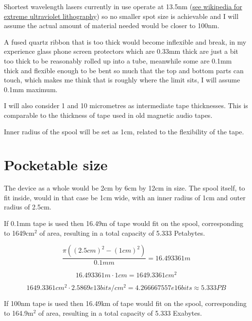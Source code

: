 \documentclass[a4paper]{article}
\begin{document}
	\medskip
	
	Shortest wavelength lasers currently in use operate at 13.5nm (\href{https://en.wikipedia.org/wiki/Extreme_ultraviolet_lithography}{see wikipedia for extreme ultraviolet lithography}) so no smaller spot size is achievable and I will assume the actual amount of material needed would be closer to 100nm.
	
	\medskip
	
	A fused quartz ribbon that is too thick would become inflexible and break, in my experience glass phone screen protectors which are 0.33mm thick are just a bit too thick to be reasonably rolled up into a tube, meanwhile some are 0.1mm thick and flexible enough to be bent so much that the top and bottom parts can touch, which makes me think that is roughly where the limit sits, I will assume 0.1mm maximum.
	
	\medskip
	
	I will also consider 1 and 10 micrometres as intermediate tape thicknesses. This is comparable to the thickness of tape used in old magnetic audio tapes.
	
	\bigskip
	
	Inner radius of the spool will be set as 1cm, related to the flexibility of the tape.
	
	\pagebreak
	
	\section{Pocketable size}
	
	The device as a whole would be 2cm by 6cm by 12cm in size. The spool itself, to fit inside, would in that case be 1cm wide, with an inner radius of 1cm and outer radius of 2.5cm. 
	
	\vfill
	
	If 0.1mm tape is used then 16.49m of tape would fit on the spool, corresponding to 1649cm$^2$ of area, resulting in a total capacity of 5.333 Petabytes.
	
	$$ \frac{\pi ((2.5cm)^2 - (1cm)^2)}{0.1mm} =  16.493361m$$
	
	$$ 16.493361m \cdot 1cm =  1649.3361cm^2 $$
	
	$$ 1649.3361cm^2 \cdot 2.5869e13bits/cm^2 = 4.266667557e16 bits \approx 5.333PB $$
	
	\vfill
	
	If 100nm tape is used then 16.49km of tape would fit on the spool, corresponding to 164.9m$^2$ of area, resulting in a total capacity of 5.333 Exabytes.
	
\end{document}
